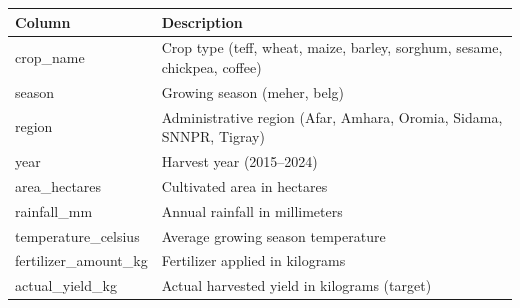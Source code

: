 \documentclass[12pt,a4paper,oneside]{report}
\begin{document}
\begin{appendix}
\begin{longtable}{ll}
\textbf{Column} & \textbf{Description} \\

\endhead

\endfoot

\endlastfoot
crop\_name & Crop type (teff, wheat, maize, barley, sorghum, sesame, chickpea, coffee) \\
season & Growing season (meher, belg) \\
region & Administrative region (Afar, Amhara, Oromia, Sidama, SNNPR, Tigray) \\
year & Harvest year (2015--2024) \\
area\_hectares & Cultivated area in hectares \\
rainfall\_mm & Annual rainfall in millimeters \\
temperature\_celsius & Average growing season temperature \\
fertilizer\_amount\_kg & Fertilizer applied in kilograms \\
actual\_yield\_kg & Actual harvested yield in kilograms (target) \\
\end{longtable}


\end{appendix}
\end{document}
